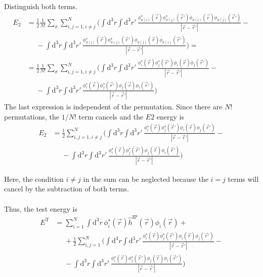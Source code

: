 \documentclass{article}
\newcommand{\diff}{\mathrm{d}}
\begin{document}
{\newpage


Distinguish both terms.
	\begin{align*}
		E_2 &= \frac{1}{2}\frac{1}{N!} \sum_\sigma \sum_{i,j=1,i\neq j}^N \Bigg( \int\diff^3r \int\diff^3r' \, \frac{\phi_{\sigma(i)}^\star(\vec{r}) \phi_{\sigma(j)}^\star(\vec{r}') \phi_{\sigma(i)}(\vec{r}) \phi_{\sigma(j)}(\vec{r}')}{|\vec{r} - \vec{r}'|} - \\
		&\phantom{=} - \int\diff^3r \int\diff^3r' \, \frac{\phi_{\sigma(i)}^\star(\vec{r}) \phi_{\sigma(j)}^\star(\vec{r}') \phi_{\sigma(j)}(\vec{r}) \phi_{\sigma(i)}(\vec{r}')}{|\vec{r} - \vec{r}'|} \Bigg) = \\
		&= \frac{1}{2}\frac{1}{N!} \sum_\sigma \sum_{i,j=1,i\neq j}^N \Bigg( \int\diff^3r \int\diff^3r' \, \frac{\phi_i^\star(\vec{r}) \phi_j^\star(\vec{r}') \phi_i(\vec{r}) \phi_j(\vec{r}')}{|\vec{r} - \vec{r}'|} - \\
		&\phantom{=} - \int\diff^3r \int\diff^3r' \, \frac{\phi_i^\star(\vec{r}) \phi_j^\star(\vec{r}') \phi_j(\vec{r}) \phi_i(\vec{r}')}{|\vec{r} - \vec{r}'|} \Bigg)
	\end{align*}
	The last expression is independent of the permutation. Since there are $N!$ permutations, the $1/N!$ term cancels and the $E2$ energy is
		\begin{align*}
			E_2 &= \frac{1}{2} \sum_{i,j=1,i\neq j}^N \Bigg( \int\diff^3r \int\diff^3r' \, \frac{\phi_i^\star(\vec{r}) \phi_j^\star(\vec{r}') \phi_i(\vec{r}) \phi_j(\vec{r}')}{|\vec{r} - \vec{r}'|} - \\
		&\phantom{=} - \int\diff^3r \int\diff^3r' \, \frac{\phi_i^\star(\vec{r}) \phi_j^\star(\vec{r}') \phi_j(\vec{r}) \phi_i(\vec{r}')}{|\vec{r} - \vec{r}'|} \Bigg)
		\end{align*}
	
	Here, the condition $i\neq j$ in the sum can be neglected because the $i=j$ terms will cancel by the subtraction of both terms.\\
	\\
	Thus, the test energy is
		\begin{align*}
			E^\text{T} &= \sum_{i=1}^N \int \diff^3r \, \phi_i^\star(\vec{r}) \hat{h}^\text{IP}(\vec{r}) \phi_i(\vec{r}) + \\
			 &\phantom{=} + \frac{1}{2} \sum_{i,j=1}^N \Bigg( \int\diff^3r \int\diff^3r' \, \frac{\phi_i^\star(\vec{r}) \phi_j^\star(\vec{r}') \phi_i(\vec{r}) \phi_j(\vec{r}')}{|\vec{r} - \vec{r}'|} - \\
		&\phantom{=} - \int\diff^3r \int\diff^3r' \, \frac{\phi_i^\star(\vec{r}) \phi_j^\star(\vec{r}') \phi_j(\vec{r}) \phi_i(\vec{r}')}{|\vec{r} - \vec{r}'|} \Bigg)
		\end{align*}

}
\end{document}
